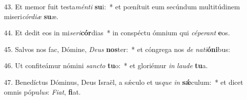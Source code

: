 43. Et memor fuit testa\textit{mén}\textit{ti} \textbf{su}i:~*  et pœnítuit eum secúndum multitúdinem miseri\textit{cór}\textit{di}\textit{æ} \textbf{su}æ.\

44. Et dedit eos in mi\textit{se}\textit{ri}\textbf{cór}dias~*  in conspéctu ómnium qui \textit{cé}\textit{pe}\textit{rant} \textbf{e}os.\

45. Salvos nos fac, Dómine, \textit{De}\textit{us} \textbf{nos}ter:~*  et cóngrega nos \textit{de} \textit{na}\textit{ti}\textbf{ó}\textbf{ni}bus:\

46. Ut confiteámur nómini \textit{sanc}\textit{to} \textbf{tu}o:~*  et gloriémur \textit{in} \textit{lau}\textit{de} \textbf{tu}a.\

47. Benedíctus Dóminus, Deus Israël, a sǽculo et us\textit{que} \textit{in} \textbf{sǽ}culum:~*  et dicet omnis pópu\textit{lus}: \textit{Fi}\textit{at}, \textbf{fi}at.\

